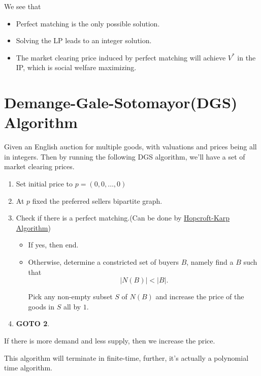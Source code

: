 \begin{remark}
	We see that
	\begin{itemize}
		\item Perfect matching is the only possible solution.
		\item Solving the LP leads to an integer solution.
		\item The market clearing price induced by perfect matching will achieve \(V^{*}\) in the IP, which is social welfare maximizing.
	\end{itemize}
\end{remark}

\section{Demange-Gale-Sotomayor(DGS) Algorithm}
Given an English auction for multiple goods, with valuations and prices being all in integers. Then by running the following DGS algorithm, we'll have
a set of market clearing prices.
\begin{enumerate}
	\item Set initial price to \(p = (0, 0, \ldots , 0 )\)
	\item At \(p\) fixed the preferred sellers bipartite graph.
	\item Check if there is a perfect matching.(Can be done by \hyperref[Hopcroft-Karp Algorithm]{Hopcroft-Karp Algorithm})
	      \begin{itemize}
		      \item If yes, then end.
		      \item Otherwise, determine a constricted set of buyers \(B\), namely find a \(B\) such that
		            \[
			            \left\vert N(B) \right\vert < \left\vert B \right\vert.
		            \]

		            Pick any non-empty subset \(S\) of \(N(B)\) and increase the price of the goods in \(S\) all by \(1\).
	      \end{itemize}
	\item \textbf{GOTO 2}.
\end{enumerate}

\begin{intuition}
	If there is more demand and less supply, then we increase the price.
\end{intuition}

\begin{remark}
	This algorithm will terminate in finite-time, further, it's actually a polynomial time algorithm.
\end{remark}

